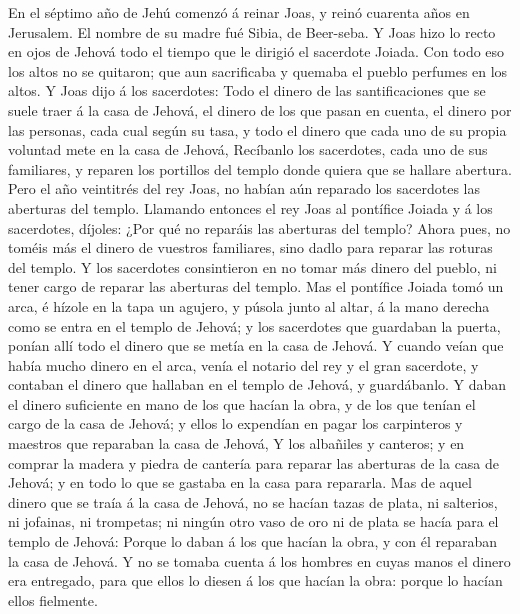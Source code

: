  En el séptimo año de Jehú comenzó á reinar Joas, y reinó
cuarenta años en Jerusalem. El nombre de su madre fué Sibia, de
Beer-seba.  Y Joas hizo lo recto en ojos de Jehová todo el
tiempo que le dirigió el sacerdote Joiada.  Con todo eso
los altos no se quitaron; que aun sacrificaba y quemaba el pueblo
perfumes en los altos.  Y Joas dijo á los sacerdotes: Todo
el dinero de las santificaciones que se suele traer á la casa de Jehová,
el dinero de los que pasan en cuenta, el dinero por las personas, cada
cual según su tasa, y todo el dinero que cada uno de su propia voluntad
mete en la casa de Jehová,  Recíbanlo los sacerdotes, cada
uno de sus familiares, y reparen los portillos del templo donde quiera
que se hallare abertura.  Pero el año veintitrés del rey
Joas, no habían aún reparado los sacerdotes las aberturas del templo.
 Llamando entonces el rey Joas al pontífice Joiada y á los
sacerdotes, díjoles: ¿Por qué no reparáis las aberturas del templo?
Ahora pues, no toméis más el dinero de vuestros familiares, sino dadlo
para reparar las roturas del templo.  Y los sacerdotes
consintieron en no tomar más dinero del pueblo, ni tener cargo de
reparar las aberturas del templo.  Mas el pontífice Joiada
tomó un arca, é hízole en la tapa un agujero, y púsola junto al altar, á
la mano derecha como se entra en el templo de Jehová; y los sacerdotes
que guardaban la puerta, ponían allí todo el dinero que se metía en la
casa de Jehová.  Y cuando veían que había mucho dinero en
el arca, venía el notario del rey y el gran sacerdote, y contaban el
dinero que hallaban en el templo de Jehová, y guardábanlo.
 Y daban el dinero suficiente en mano de los que hacían
la obra, y de los que tenían el cargo de la casa de Jehová; y ellos lo
expendían en pagar los carpinteros y maestros que reparaban la casa de
Jehová,  Y los albañiles y canteros; y en comprar la
madera y piedra de cantería para reparar las aberturas de la casa de
Jehová; y en todo lo que se gastaba en la casa para repararla.
 Mas de aquel dinero que se traía á la casa de Jehová, no
se hacían tazas de plata, ni salterios, ni jofainas, ni trompetas; ni
ningún otro vaso de oro ni de plata se hacía para el templo de Jehová:
 Porque lo daban á los que hacían la obra, y con él
reparaban la casa de Jehová.  Y no se tomaba cuenta á los
hombres en cuyas manos el dinero era entregado, para que ellos lo diesen
á los que hacían la obra: porque lo hacían ellos fielmente.
